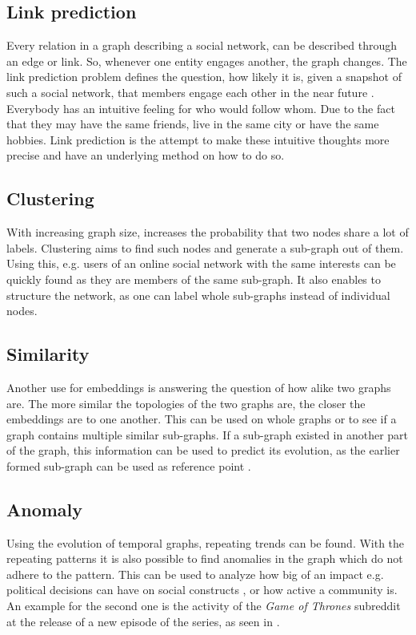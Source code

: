 \documentclass[sigconf]{acmart}
\begin{document}
\subsection{Link prediction}
Every relation in a graph describing a social network, can be described  through an edge or link. So, whenever one entity engages another, the graph changes.
The link prediction problem defines the question, how likely it is, given a snapshot of such a social network, that members engage each other in the near future \cite{LibenNowell.op.2003}.
Everybody has an intuitive feeling for who would follow whom. Due to the fact that they may have the same friends, live in the same city or have the same hobbies. 
Link prediction is the attempt to make these intuitive thoughts more precise and have an underlying method on how to do so.

\subsection{Clustering}
With increasing graph size, increases the probability that two nodes share a lot of labels. 
Clustering aims to find such nodes and generate a sub-graph out of them. Using this, e.g. users of an online social network with the same interests can be quickly found as they are members of the same sub-graph.
It also enables to structure the network, as one can label whole sub-graphs instead of individual nodes. \cite{Ding.2001}

\subsection{Similarity}
Another use for embeddings is answering the question of how alike two graphs are. The more similar the topologies of the two graphs are, the closer the embeddings are to one another. This can be used on whole graphs or to see if a graph
contains multiple similar sub-graphs. If a sub-graph existed in another part of the graph, this information can be used to predict its evolution, as the earlier formed sub-graph can be used as reference point \cite{Beladev.2020}.

\subsection{Anomaly}
Using the evolution of temporal graphs, repeating trends can be found. With the repeating patterns it is also possible to find anomalies in the graph which do not adhere to the pattern.
This can be used to analyze how big of an impact e.g. political decisions can have on social constructs \cite{Beladev.2020}, or how active a community is. An example for the second one is 
the activity of the \emph{Game of Thrones} subreddit at the release of a new episode of the series, as seen in \cite{Beladev.2020}. 
\end{document}
